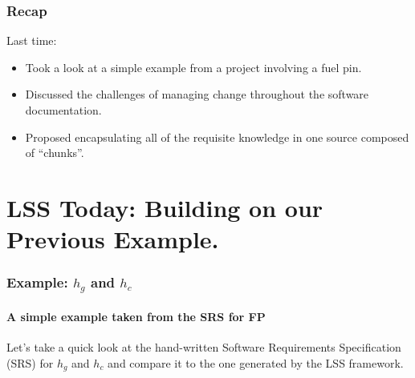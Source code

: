 \documentclass{beamer}
\begin{document}

%


\begin{frame}

\frametitle{Recap}

Last time:
\begin{itemize}
\item Took a look at a simple example from a project involving a fuel pin.
\item Discussed the challenges of managing change throughout the software documentation.
\item Proposed encapsulating all of the requisite knowledge in one source composed of ``chunks''.
\end{itemize}

\end{frame}


\section[Example]{LSS Today: Building on our Previous Example.}


\begin{frame}

\frametitle{Example: $h_g$ and $h_c$}

\framesubtitle{A simple example taken from the SRS for FP}

Let's take a quick look at the hand-written Software Requirements 
Specification (SRS) for $h_g$ and $h_c$
	and compare it to the one generated by the LSS framework.


\end{frame}
\end{document}
